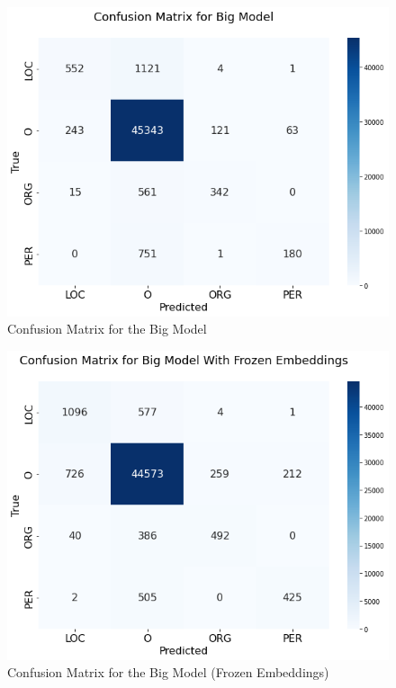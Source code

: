 \documentclass{article}
\begin{document}
\begin{figure}[]
    \centering
    \includegraphics[scale=0.5]{confusion_matrix_bigModel.png}
    \caption{Confusion Matrix for the Big Model}
    \label{fig:cm_big}
\end{figure}

\begin{figure}[]
    \centering
    \includegraphics[scale=0.5]{confusion_matrix_bigModelFrozen.png}
    \caption{Confusion Matrix for the Big Model (Frozen Embeddings)}
    \label{fig:cm_bigFrozen}
\end{figure}
\end{document}
